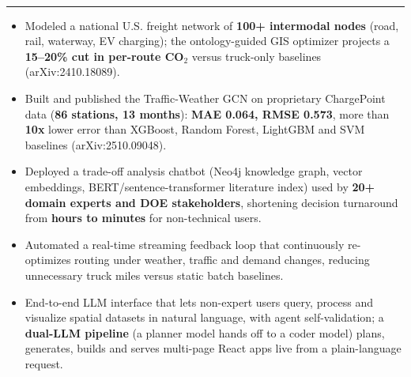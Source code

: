 \documentclass[10pt,a4paper]{extarticle}
\newif\ifteaching
\newcommand{\sect}[2][]{\needspace{45pt}\vspace{9pt}%
  {\color{navy}\bfseries\large\textls[60]{\MakeUppercase{#2}}}{\color{muted}\small\ #1}\\[-6.5pt]
  {\color{navy}\rule{\linewidth}{0.5pt}}\par\vspace{-1pt}}
\newcommand{\job}[4]{\vspace{3.5pt}\noindent{\bfseries #1}\ {\color{muted}$\cdot$}\ #2\hfill{\color{muted}#3}\par
  \if\relax\detokenize{#4}\relax\else\vspace{-1pt}{\color{muted}\small\itshape #4}\par\fi\vspace{-1pt}}
\newcommand{\m}[1]{\textbf{#1}}
\begin{document}
\sect{Projects}
\ifteaching\job{RECOIL}{Cognitive Freight Transportation Digital Twin}{Jul 2024 -- Mar 2026}{Lead AI/Data Engineer \ $\cdot$\ DOE ARPA-E, \$3M (DE-AR0001780) \ $\cdot$\ m1.recoil.ise.utk.edu}\else{}\fi
\begin{itemize}
\item Modeled a national U.S. freight network of \m{100+ intermodal nodes} (road, rail, waterway, EV charging); the ontology-guided GIS optimizer projects a \m{15--20\% cut in per-route CO$_2$} versus truck-only baselines (arXiv:2410.18089).
\item Built and published the Traffic-Weather GCN on proprietary ChargePoint data (\m{86 stations, 13 months}): \m{MAE 0.064, RMSE 0.573}, \ifteaching against SVM 0.649, XGBoost 0.941, Random Forest 0.936, LightGBM 0.948 and Linear Regression 1.022 MAE\else more than \m{10x} lower error than XGBoost, Random Forest, LightGBM and SVM baselines\fi{} (arXiv:2510.09048).
\item Deployed a trade-off analysis chatbot (Neo4j knowledge graph, vector embeddings, BERT/sentence-transformer literature index) used by \m{20+ domain experts and DOE stakeholders}, shortening decision turnaround from \m{hours to minutes} for non-technical users.
\item Automated a real-time streaming feedback loop that continuously re-optimizes routing under weather, traffic and demand changes, reducing unnecessary truck miles versus static batch baselines.
\end{itemize}

\ifteaching\job{Automated Geospatial Analysis Interface}{ORNL, NSRD}{Mar 2025 -- Present}{github.com/jtupayachi/smartgiscavp \ $\cdot$\ ORNL IP disclosure (2026)}\else{}\fi
\begin{itemize}
\item End-to-end LLM interface that lets non-expert users query, process and visualize spatial datasets in natural language, with agent self-validation; a \m{dual-LLM pipeline} (a planner model hands off to a coder model) plans, generates, builds and serves multi-page React apps live from a plain-language request.
\end{itemize}
\end{document}

